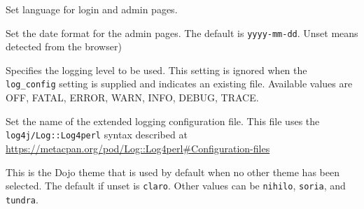 \begin{description}[style=nextline]
	\item[language] Set language for login and admin pages. 
	\item[date\_format] Set the date format for the admin pages.  The default is \texttt{yyyy-mm-dd}. Unset means detected from the browser)
	\item[log\_level] Specifies the logging level to be used. This setting is ignored when the \texttt{log\_config} setting 
	is supplied and indicates an existing file. Available values are OFF, FATAL, ERROR, WARN, INFO, DEBUG, TRACE.
	\item [log\_config] Set the name of the extended logging configuration file. This file uses the \texttt{log4j/Log::Log4perl} syntax described at \url{https://metacpan.org/pod/Log::Log4perl#Configuration-files}
	\item [dojo\_theme] This is the Dojo theme that is used by default when no other theme
	has been selected.  The default if unset is \texttt{claro}. Other values can be \texttt{nihilo}, \texttt{soria}, and \texttt{tundra}.
	
	
	
\end{description}

